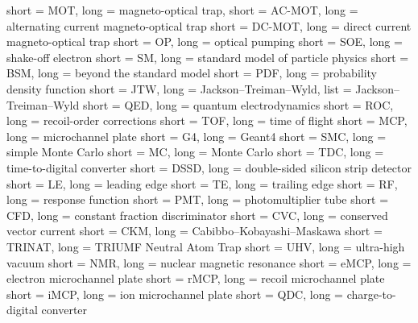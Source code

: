 % 
% 
% 

{
	short = MOT,
	long = magneto-optical trap,
}
{
	short = AC-MOT,
	long = alternating current magneto-optical trap
}
{
	short = DC-MOT,
	long = direct current magneto-optical trap
}
{
	short = OP,
	long = optical pumping
}
{
	short = SOE,
	long = shake-off electron
}
{
	short = SM,
	long = standard model of particle physics
}
{
	short = BSM,
	long = beyond the standard model
}
{
	short = PDF,
	long = probability density function
}
{
	short = JTW,
	long = Jackson--Treiman--Wyld,
	list = Jackson--Treiman--Wyld \cite{jtw,jtw_coulomb}
}
{
	short = QED,
	long = quantum electrodynamics
}
{
	short = ROC,
	long = recoil-order corrections
}
{
	short = TOF,
	long = time of flight
}
{
	short = MCP,
	long = microchannel plate
}
{
	short = G4,
	long = Geant4
}
{
	short = SMC,
	long = simple Monte Carlo
}
{
	short = MC,
	long = Monte Carlo
}
{
	short = TDC,
	long = time-to-digital converter
}
{
	short = DSSD,
	long = double-sided silicon strip detector
}
{
	short = LE,
	long = leading edge
}
{
	short = TE,
	long = trailing edge
}
{
	short = RF,
	long = response function
}
{
	short = PMT,
	long = photomultiplier tube
}
{
	short = CFD,
	long = constant fraction discriminator
}
{
	short = CVC,
	long = conserved vector current
}
{
	short = CKM,
	long = Cabibbo--Kobayashi--Maskawa
}
{
	short = TRINAT,
	long = TRIUMF Neutral Atom Trap
}
{
	short = UHV,
	long = ultra-high vacuum
}
{
	short = NMR,
	long = nuclear magnetic resonance
}
{
	short = eMCP,
	long = electron microchannel plate
}
{
	short = rMCP,
	long = recoil microchannel plate
}
{
	short = iMCP,
	long = ion microchannel plate
}
{
	short = QDC,
	long = charge-to-digital converter
}













